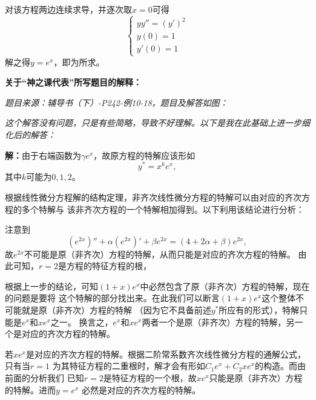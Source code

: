 对该方程两边连续求导，并逐次取$x=0$可得
$$\left\{\begin{array}{l}
yy''=(y')^2\\
y(0)=1\\
y'(0)=1
\end{array}\right.$$
解之得$y=e^x$，即为所求。



	\newpage
	
	{\bf 关于“神之课代表”所写题目的解释：}
	
	{\it 题目来源：辅导书（下）-P242-例10-18，题目及解答如图：}
	
	\begin{center}
	\end{center}
	
	{\it 这个解答没有问题，只是有些简略，导致不好理解。以下是我在此基础上进一步细化后的解答：}
	
	{\bf 解：}由于右端函数为$\gamma e^x$，故原方程的特解应该形如
	$$y^*=x^ke^x,$$
	其中$k$可能为$0,1,2$。
	
	根据线性微分方程解的结构定理，非齐次线性微分方程的特解可以由对应的齐次方程的多个特解与
	该非齐次方程的一个特解相加得到。以下利用该结论进行分析：
	
	注意到
	$$(e^{2x})''+\alpha(e^{2x})'+\beta e^{2x}
	=(4+2\alpha+\beta)e^{2x},$$
	故$e^{2x}$不可能是原（非齐次）方程的特解，从而只能是对应的齐次方程的特解。
	由此可知，$r=2$是方程的特征方程的根，
	
	根据上一步的结论，可知$(1+x)e^x$中必然包含了原（非齐次）方程的特解，现在的问题是要将
	这个特解的部分找出来。在此我们可以断言$(1+x)e^x$这个整体不可能就是原（非齐次）方程的特解
	（因为它不具备前述$y^*$所应有的形式），特解只能是$e^x$和$xe^x$之一。
	换言之，$e^x$和$xe^x$两者一个是原（非齐次）方程的特解，另一个是对应的齐次方程的特解。
	
	若$xe^x$是对应的齐次方程的特解。根据二阶常系数齐次线性微分方程的通解公式，只有当$r=1$
	为其特征方程的二重根时，解才会有形如$C_1e^x+C_2xe^x$的构造。而由前面的分析我们
	已知$r=2$是特征方程的一个根，故$xe^x$只能是原（非齐次）方程的特解。进而$y=e^x$
	必然是对应的齐次方程的特解。
	
